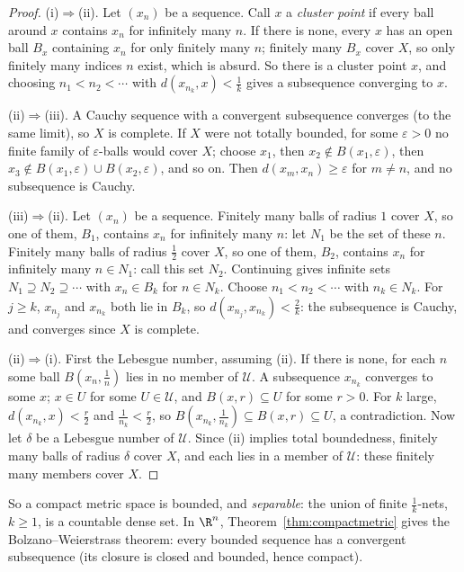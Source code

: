 \begin{proof}
(i)$\Rightarrow$(ii). Let $(x_n)$ be a sequence. Call $x$ a \emph{cluster point} if every ball around $x$ contains $x_n$ for infinitely many $n$. If there is none, every $x$
has an open ball $B_x$ containing $x_n$ for only finitely many $n$; finitely many $B_x$ cover $X$, so only finitely many indices $n$ exist, which is absurd. So
there is a cluster point $x$, and choosing $n_1<n_2<\cdots$ with $d(x_{n_k},x)<\frac1k$ gives a subsequence converging to $x$.

(ii)$\Rightarrow$(iii). A Cauchy sequence with a convergent subsequence converges (to the same limit), so $X$ is complete. If $X$ were not totally bounded,
for some $\varepsilon>0$ no finite family of $\varepsilon$-balls would cover $X$; choose $x_1$, then $x_2\notin B(x_1,\varepsilon)$, then $x_3\notin B(x_1,\varepsilon)\cup B(x_2,\varepsilon)$, and so on. Then
$d(x_m,x_n)\ge\varepsilon$ for $m\ne n$, and no subsequence is Cauchy.

(iii)$\Rightarrow$(ii). Let $(x_n)$ be a sequence. Finitely many balls of radius $1$ cover $X$, so one of them, $B_1$, contains $x_n$ for infinitely many $n$: let $N_1$ be the set
of these $n$. Finitely many balls of radius $\frac12$ cover $X$, so one of them, $B_2$, contains $x_n$ for infinitely many $n\in N_1$: call this set $N_2$. Continuing gives infinite
sets $N_1\supseteq N_2\supseteq\cdots$ with $x_n\in B_k$ for $n\in N_k$. Choose $n_1<n_2<\cdots$ with $n_k\in N_k$. For $j\ge k$, $x_{n_j}$ and $x_{n_k}$ both lie in $B_k$, so
$d(x_{n_j},x_{n_k})<\frac2k$: the subsequence is Cauchy, and converges since $X$ is complete.

(ii)$\Rightarrow$(i). First the Lebesgue number, assuming (ii). If there is none, for each $n$ some ball $B(x_n,\frac1n)$ lies in no member of $\mathcal U$. A subsequence
$x_{n_k}$ converges to some $x$; $x\in U$ for some $U\in\mathcal U$, and $B(x,r)\subseteq U$ for some $r>0$. For $k$ large, $d(x_{n_k},x)<\frac r2$ and $\frac1{n_k}<\frac r2$, so $B(x_{n_k},\frac1{n_k})\subseteq B(x,r)\subseteq U$,
a contradiction. Now let $\delta$ be a Lebesgue number of $\mathcal U$. Since (ii) implies total boundedness, finitely many balls of radius $\delta$ cover $X$, and each lies
in a member of $\mathcal U$: these finitely many members cover $X$.
\end{proof}

So a compact metric space is bounded, and \emph{separable}: the union of finite $\frac1k$-nets, $k\ge1$, is a countable dense set. In $\R^n$, Theorem~\ref{thm:compactmetric}
gives the Bolzano--Weierstrass theorem: every bounded sequence has a convergent subsequence (its closure is closed and bounded, hence compact).

